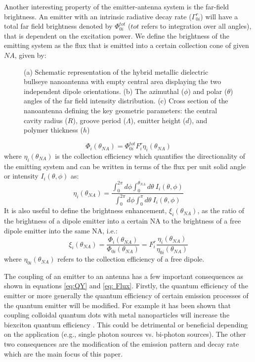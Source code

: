 \documentclass[10pt,onecolumn ]{article}
\begin{document}
Another interesting property of the emitter-antenna system is the far-field brightness. An emitter with an intrinsic radiative decay rate ($\Gamma^r_{0i}$) will have a total far field brightness denoted by $\Phi^{tot}_{0i}$ ($tot$ refers to integration over all angles), that is dependent on the excitation power.
We define the brightness of the emitting system as the flux that is emitted into a certain collection cone of given $NA$, given by:

\begin{figure}[t!]
\caption{(a) Schematic representation of the hybrid metallic dielectric bullseye nanoantenna with empty central area displaying the two independent dipole orientations. (b) The azimuthal ($\phi$) and polar ($\theta$) angles of the far field intensity distribution. (c) Cross section of the nanoantenna defining the key geometric parameters: the central cavity radius ($R$), groove period ($\Lambda$),    emitter height ($d$), and polymer thickness ($h$) }
\label{fig:1}
\end{figure}
\begin{equation}
\label{eq: Flux}
\Phi_i(\theta_{NA})=\Phi^{tot}_{0i} F^r_i \eta_i(\theta_{NA})
\end{equation}
where $\eta_i(\theta_{NA})$ is the collection efficiency which quantifies the directionality of the emitting system and can be written in terms of the flux per unit solid angle or intensity $I_i(\theta,\phi)$ as:
\begin{equation}
\label{eq: CollEff}
\eta_i(\theta_{NA})=\frac{\int_0^{2\pi}d\phi\int_0^{\theta_{NA}} d\theta\ I_i(\theta,\phi)}{\int_0^{2\pi}d\phi\int_0^{\pi} d\theta\ I_i(\theta,\phi)}
\end{equation}
It is also useful to define the brightness enhancement, $\xi_i(\theta_{NA})$,  as the ratio of the brightness of a dipole emitter into a certain NA to the brightness of a free dipole emitter into the same NA, i.e.:
\begin{equation}
\label{eq: BrightnessEnhancement}
\xi_i(\theta_{NA})= \frac{\Phi_i(\theta_{NA})}{\Phi_{0i}(\theta_{NA})} =  F^r_i \frac{\eta_i(\theta_{NA})}{\eta_{0i}(\theta_{NA})}
\end{equation}
where $\eta_{0i}(\theta_{NA})$ refers to the collection efficiency of a free dipole. 

The coupling of an emitter to an antenna has a few important consequences as shown in equations \ref{eq:QY} and \ref{eq: Flux}. 
Firstly, the quantum efficiency of the emitter or more generally the quantum efficiency of certain emission processes of the quantum emitter will be modified. For example it has been shown that  coupling colloidal quantum dots with metal nanoparticles will increase the biexciton quantum efficiency \cite{Matsuzaki2017StrongAntenna}. 
This could be detrimental or beneficial depending on the application (e.g., single photon sources vs. bi-photon sources).
The other two consequences are the modification of the emission pattern and decay rate which are the main focus of this paper. 
\end{document}
